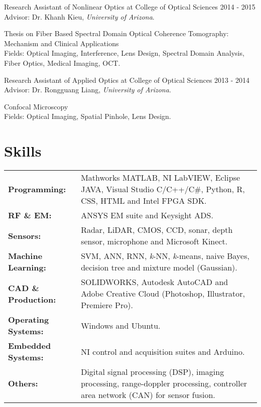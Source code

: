 \documentclass[letterpaper,10pt]{article}
\renewenvironment{itemize}{
  \begin{list}{}{
    \setlength{\leftmargin}{1.5em}
  }
}{
  \end{list}
}
\begin{document}
\begin{itemize}
\begin{itemize}
\end{itemize}

\item [--] Research Assistant of Nonlinear Optics at College of Optical Sciences \hfill 2014 - 2015\\
Advisor: Dr. Khanh Kieu, {\it University of Arizona}.
\begin{itemize}
\item [--] Thesis on Fiber Based Spectral Domain Optical Coherence Tomography: Mechanism and Clinical Applications\\
Fields: Optical Imaging, Interference, Lens Design, Spectral Domain Analysis, Fiber Optics, Medical Imaging, OCT.
\end{itemize}


\item [--] Research Assistant of Applied Optics at College of Optical Sciences \hfill 2013 - 2014\\
Advisor: Dr. Rongguang Liang, {\it University of Arizona}.
\begin{itemize}
\item [--] Confocal Microscopy\\
Fields: Optical Imaging, Spatial Pinhole, Lens Design.
\end{itemize}


\end{itemize}
\section*{Skills}
\begin{tabularx}{\textwidth}{lX}
{\bf Programming:} & Mathworks MATLAB, NI LabVIEW, Eclipse JAVA, Visual Studio C/C++/C\#, Python, R, CSS, HTML and Intel FPGA SDK.\\
{\bf RF \& EM:} & ANSYS EM suite and Keysight ADS.\\
{\bf Sensors:} & Radar, LiDAR, CMOS, CCD, sonar, depth sensor, microphone and Microsoft Kinect.\\
{\bf Machine Learning:} & SVM, ANN, RNN, {\it k}-NN, {\it k}-means, naive Bayes, decision tree and mixture model (Gaussian).\\
{\bf CAD \& Production:} & SOLIDWORKS, Autodesk AutoCAD and Adobe Creative Cloud (Photoshop, Illustrator, Premiere Pro).\\
{\bf Operating Systems:} & Windows and Ubuntu.\\
{\bf Embedded Systems:} & NI control and acquisition suites and Arduino.\\
{\bf Others:} & Digital signal processing (DSP), imaging processing, range-doppler processing, controller area network (CAN) for sensor fusion.\\
\end{tabularx}
\end{document}
